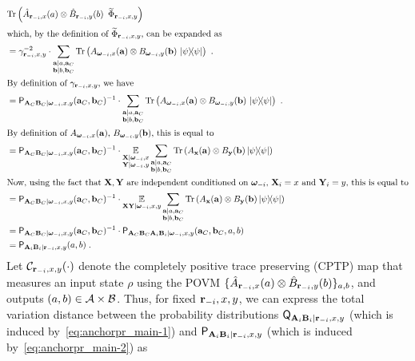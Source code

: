 \begin{align}
	&\mbox{\rm Tr} \left ( \hat{A}_{\mathbf{r}_{-i}, x}(a) \otimes \hat{B}_{\mathbf{r}_{-i}, y}(b) \,\,\,\widetilde{\Phi}_{{\mathbf{r}_{-i} , x,y}} \right ) \label{eq:anchorpr_main-2} \\
	\intertext{which, by the definition of $\widetilde{\Phi}_{{\mathbf{r}_{-i} , x,y}}$, can be expanded as}
	&= \gamma_{\mathbf{r}_{-i} , x,y}^{-2} \cdot \sum_{\substack{\mathbf{a} | a, \mathbf{a}_C \\ \mathbf{b} | b, \mathbf{b}_C}}  \mbox{\rm Tr} \left ( A_{{\boldsymbol{\omega}}_{-i},x}(\mathbf{a}) \otimes B_{{\boldsymbol{\omega}}_{-i},y}(\mathbf{b}) \,\, |\psi\rangle\! \langle \psi| \right )~. \notag \\
	\intertext{By definition of $\gamma_{\mathbf{r}_{-i} , x,y}$, we have}
	&= \mathsf{P}_{\mathbf{A}_C \mathbf{B}_C|{\boldsymbol{\omega}}_{-i}, x, y}(\mathbf{a}_C,\mathbf{b}_C)^{-1} \cdot \sum_{\substack{\mathbf{a} | a, \mathbf{a}_C \\ \mathbf{b} | b, \mathbf{b}_C}}  \mbox{\rm Tr} \left ( A_{{\boldsymbol{\omega}}_{-i},x}(\mathbf{a}) \otimes B_{{\boldsymbol{\omega}}_{-i},y}(\mathbf{b}) \,\, |\psi\rangle\! \langle \psi| \right )~. \notag \\
	\intertext{By definition of $A_{{\boldsymbol{\omega}}_{-i},x}(\mathbf{a})$, $B_{{\boldsymbol{\omega}}_{-i},y}(\mathbf{b})$, this is equal to}
	&= 	\mathsf{P}_{\mathbf{A}_C \mathbf{B}_C|{\boldsymbol{\omega}}_{-i}, x,y}(\mathbf{a}_C,\mathbf{b}_C)^{-1} \cdot \operatorname*{\mathbb{E}}_{\substack{\mathbf{X}| {\boldsymbol{\omega}}_{-i}, x \\ \mathbf{Y}| {\boldsymbol{\omega}}_{-i} ,y}} \sum_{\substack{\mathbf{a} | a, \mathbf{a}_C \\ \mathbf{b} | b, \mathbf{b}_C}}  \mbox{\rm Tr} \left ( A_{\mathbf{x}}(\mathbf{a}) \otimes B_{\mathbf{y}}(\mathbf{b}) \, |\psi\rangle\! \langle \psi| \right )\notag \\
	\intertext{Now, using the fact that $\mathbf{X}, \mathbf{Y}$ are independent conditioned on ${\boldsymbol{\omega}}_{-i}$, $\mathbf{X}_i = x$ and $\mathbf{Y}_i = y$, this is equal to}
	&= 	\mathsf{P}_{\mathbf{A}_C \mathbf{B}_C|{\boldsymbol{\omega}}_{-i}, x, y}(\mathbf{a}_C,\mathbf{b}_C)^{-1} \cdot \operatorname*{\mathbb{E}}_{\mathbf{X} \mathbf{Y} | {\boldsymbol{\omega}}_{-i} ,x, y} \sum_{\substack{\mathbf{a} | a, \mathbf{a}_C \\ \mathbf{b} | b, \mathbf{b}_C}}  \mbox{\rm Tr} \left ( A_{\mathbf{x}}(\mathbf{a}) \otimes B_{\mathbf{y}}(\mathbf{b}) \, |\psi\rangle\! \langle \psi| \right ) \notag \\	
	&= \mathsf{P}_{\mathbf{A}_C \mathbf{B}_C|{\boldsymbol{\omega}}_{-i} ,x,y}(\mathbf{a}_C,\mathbf{b}_C)^{-1} \cdot \mathsf{P}_{\mathbf{A}_C\mathbf{B}_C\mathbf{A}_i \mathbf{B}_i | {\boldsymbol{\omega}}_{-i},x,y}(\mathbf{a}_C,\mathbf{b}_C,a,b) \notag \\
	&= \mathsf{P}_{\mathbf{A}_i \mathbf{B}_i | \mathbf{r}_{-i},x,y}(a,b)\;.\notag
\end{align}
Let $\mathcal{C}_{\mathbf{r}_{-i},x,y}(\cdot)$ denote the completely positive trace preserving (CPTP) map that measures an input state $\rho$ using the POVM $\{\hat{A}_{\mathbf{r}_{-i},x}(a) \otimes \hat{B}_{\mathbf{r}_{-i},y}(b) \}_{a,b}$, and outputs $(a,b) \in \mathcal{A} \times \mathcal{B}$. Thus, for fixed $\mathbf{r}_{-i}, x,y$, we can express the total variation distance between the probability distributions $\mathsf{Q}_{\mathbf{A}_i \mathbf{B}_i | \mathbf{r}_{-i}, x,y}$ (which is induced by~\eqref{eq:anchorpr_main-1})  and $\mathsf{P}_{\mathbf{A}_i \mathbf{B}_i | \mathbf{r}_{-i},x,y}$  (which is induced by~\eqref{eq:anchorpr_main-2}) as 
